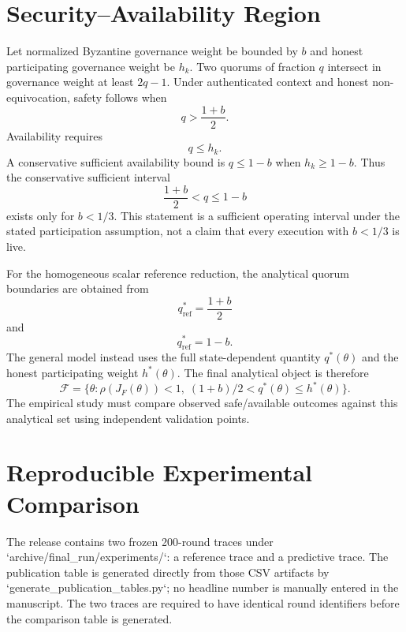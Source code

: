 \documentclass[10pt,journal]{IEEEtran}
\begin{document}
\section{Security--Availability Region}
Let normalized Byzantine governance weight be bounded by $b$ and honest participating governance weight be $h_k$. Two quorums of fraction $q$ intersect in governance weight at least $2q-1$. Under authenticated context and honest non-equivocation, safety follows when
\begin{equation}
q>\frac{1+b}{2}.
\end{equation}
Availability requires
\begin{equation}
q\le h_k.
\end{equation}
A conservative sufficient availability bound is $q\le1-b$ when $h_k\ge1-b$. Thus the conservative sufficient interval
\begin{equation}
\frac{1+b}{2}<q\le1-b
\end{equation}
exists only for $b<1/3$. This statement is a sufficient operating interval under the stated participation assumption, not a claim that every execution with $b<1/3$ is live.

For the homogeneous scalar reference reduction, the analytical quorum boundaries are obtained from
\begin{equation}
q^*_{\mathrm{ref}}=\frac{1+b}{2}
\end{equation}
and
\begin{equation}
q^*_{\mathrm{ref}}=1-b.
\end{equation}
The general model instead uses the full state-dependent quantity $q^*(\theta)$ and the honest participating weight $h^*(\theta)$. The final analytical object is therefore
\begin{equation}
\mathcal F=\{\theta:\rho(J_F(\theta))<1,\;
(1+b)/2<q^*(\theta)\le h^*(\theta)\}.
\end{equation}
The empirical study must compare observed safe/available outcomes against this analytical set using independent validation points.



\section{Reproducible Experimental Comparison}
The release contains two frozen 200-round traces under `archive/final_run/experiments/`: a reference trace and a predictive trace. The publication table is generated directly from those CSV artifacts by `generate_publication_tables.py`; no headline number is manually entered in the manuscript. The two traces are required to have identical round identifiers before the comparison table is generated.
\end{document}
